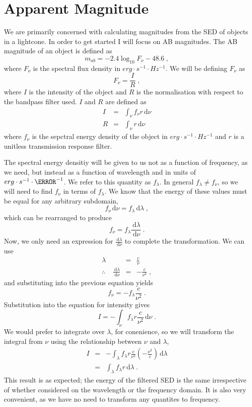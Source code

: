 \documentclass[12pt]{scrartcl}
\newcommand{\dx}[1]{\ensuremath{\,\mathrm{d}#1}}
\begin{document}
\maketitle

\section{Apparent Magnitude}

We are primarily concerned with calculating magnitudes from the
SED of objects in a lightcone. In order to get started I will
focus on AB magnitudes. The AB magnitude of an object is defined
as
\[ m_{ab} = -2.4\log_{10}F_{\nu} - 48.6 \; , \]
where $F_\nu$ is the spectral flux density in $erg\cdot s^{-1}\cdot Hz^{-1}$.
We will be defining $F_\nu$ as
\[ F_\nu = \frac{I}{R} \; , \]
where $I$ is the intensity of the object and $R$ is the normalisation
with respect to the bandpass filter used. $I$ and $R$ are defined
as
\begin{eqnarray*}
I & = & \int_\nu f_\nu r \dx{\nu} \\
R & = & \int_\nu r \dx{\nu}
\end{eqnarray*}
where $f_\nu$ is the sepctral energy density of the object in
$erg\cdot s^{-1}\cdot Hz^{-1}$ and $r$ is a unitless transmission
response filter.

The spectral energy densitiy will be given
to us not as a function of frequency, as we need, but instead as
a function of wavelength and in units of
$erg\cdot s^{-1}\cdot \angstrom^{-1}$. We refer to this quantity as
$f_\lambda$. In general $f_\lambda \ne f_\nu$, so we
will need to find $f_\nu$ in terms of $f_\lambda$.
We know that the energy of these values
must be equal for any arbitrary subdomain,
\[ f_\nu \dx{\nu} = f_\lambda \dx{\lambda} \; , \]
which can be rearranged to produce
\[ f_\nu = f_\lambda \frac{\dx{\lambda}}{\dx{\nu}} \; . \]
Now, we only need an expression for $\frac{\dx{\lambda}}{\dx{\nu}}$
to complete the transformation. We can use
\begin{eqnarray*}
\lambda & = & \frac{c}{\nu} \\
\therefore \;\;\;\; \frac{\dx{\lambda}}{\dx{\nu}} & = & -\frac{c}{\nu^2} \; ,
\end{eqnarray*}
and substituting into the previous equation yields
\[ f_\nu = -f_\lambda \frac{c}{\nu^2} \; . \]
Substitution into the equation for intensity gives
\[ I = -\int_\nu f_\lambda r \frac{c}{\nu^2} \dx{\nu} \; . \]
We would prefer to integrate over $\lambda$, for conenience, so
we will transform the integral from $\nu$ using the relationship
between $\nu$ and $\lambda$,
\begin{eqnarray*}
I & = & -\int_\lambda f_\lambda r \frac{c}{\nu^2} \left(-\frac{\nu^2}{c}\right) \dx{\lambda} \\
& = & \int_\lambda f_\lambda r \dx{\lambda} \; .
\end{eqnarray*}
This result is as expected; the energy of the filtered SED is the same
irrespective of whether considered on the wavelength or the
frequency domain. It is also very convenient, as we have no need
to transform any quantites to frequency.
\end{document}
